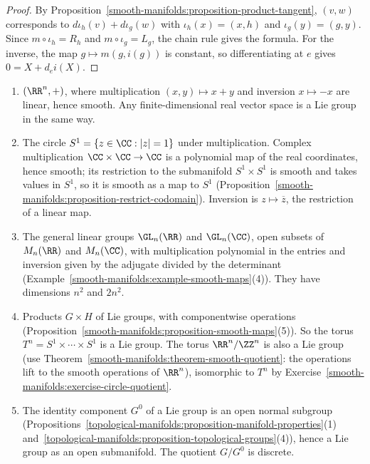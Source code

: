 \begin{proof}
By Proposition~\ref{smooth-manifolds:proposition-product-tangent}, $(v, w)$ corresponds to $d\iota_h(v) + d\iota_g(w)$ with $\iota_h(x) = (x, h)$ and
$\iota_g(y) = (g, y)$. Since $m \circ \iota_h = R_h$ and $m \circ \iota_g = L_g$, the chain rule gives the formula. For the inverse, the map
$g \mapsto m(g, i(g))$ is constant, so differentiating at $e$ gives $0 = X + d_ei(X)$.
\end{proof}

\begin{example}\label{lie-groups:example-lie-groups}
\begin{enumerate}
\item $(\RR^n, +)$, where multiplication $(x, y) \mapsto x + y$ and inversion $x \mapsto -x$ are linear, hence smooth. Any finite-dimensional real vector space
is a Lie group in the same way.
\item The circle $S^1 = \{z \in \CC : |z| = 1\}$ under multiplication. Complex multiplication $\CC \times \CC \to \CC$ is a polynomial map of the real
coordinates, hence smooth; its restriction to the submanifold $S^1 \times S^1$ is smooth and takes values in $S^1$, so it is smooth as a map to $S^1$
(Proposition~\ref{smooth-manifolds:proposition-restrict-codomain}). Inversion is $z \mapsto \overline{z}$, the restriction of a linear map.
\item The general linear groups $\GL_n(\RR)$ and $\GL_n(\CC)$, open subsets of $M_n(\RR)$ and $M_n(\CC)$, with multiplication polynomial in the entries and
inversion given by the adjugate divided by the determinant (Example~\ref{smooth-manifolds:example-smooth-maps}(4)). They have dimensions $n^2$ and $2n^2$.
\item Products $G \times H$ of Lie groups, with componentwise operations (Proposition~\ref{smooth-manifolds:proposition-smooth-maps}(5)). So the torus
$T^n = S^1 \times \cdots \times S^1$ is a Lie group. The torus $\RR^n/\ZZ^n$ is also a Lie group (use Theorem~\ref{smooth-manifolds:theorem-smooth-quotient}:
the operations lift to the smooth operations of $\RR^n$), isomorphic to $T^n$ by Exercise~\ref{smooth-manifolds:exercise-circle-quotient}.
\item The identity component $G^0$ of a Lie group is an open normal subgroup
(Propositions~\ref{topological-manifolds:proposition-manifold-properties}(1) and~\ref{topological-manifolds:proposition-topological-groups}(4)), hence a Lie
group as an open submanifold. The quotient $G/G^0$ is discrete.
\end{enumerate}
\end{example}

